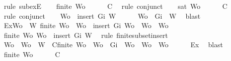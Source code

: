 \begin{isabellebody}
\ {\isacharparenleft}rule\ subexE{\isacharparenright}\isanewline
\ \ \isamarkupfalse%
\ {\isachardoublequoteopen}finite\ Wo{\isachardoublequoteclose}\isanewline
\ \ \ \ \isamarkupfalse%
\ C{}\ \isamarkupfalse%
\ {\isacharparenleft}rule\ conjunct{}{\isacharparenright}\isanewline
\ \ \isamarkupfalse%
\ {\isachardoublequoteopen}{\isasymnot}{\isacharparenleft}sat\ Wo{\isacharparenright}{\isachardoublequoteclose}\isanewline
\ \ \ \ \isamarkupfalse%
\ C{}\ \isamarkupfalse%
\ {\isacharparenleft}rule\ conjunct{}{\isacharparenright}\isanewline
\ \ \isamarkupfalse%
\ {\isachardoublequoteopen}Wo\ {\isasymsubseteq}\ insert\ Gi\ W{\isachardoublequoteclose}\isanewline
\ \ \ \ \isamarkupfalse%
\ {\isacartoucheopen}Wo\ {\isasymsubseteq}\ {\isacharbraceleft}Gi{\isacharbraceright}\ {\isasymunion}\ W{\isacartoucheclose}\ \isamarkupfalse%
\ blast\isanewline
\ \ \isamarkupfalse%
\ Ex{}{\isacharcolon}{\isachardoublequoteopen}{\isasymexists}Wo{\isacharprime}\ {\isasymsubseteq}\ W{\isachardot}\ finite\ Wo{\isacharprime}\ {\isasymand}\ {\isacharparenleft}Wo\ {\isacharequal}\ insert\ Gi\ Wo{\isacharprime}\ {\isasymor}\ Wo\ {\isacharequal}\ Wo{\isacharprime}{\isacharparenright}{\isachardoublequoteclose}\isanewline
\ \ \ \ \isamarkupfalse%
\ {\isacartoucheopen}finite\ Wo{\isacartoucheclose}\ {\isacartoucheopen}Wo\ {\isasymsubseteq}\ insert\ Gi\ W{\isacartoucheclose}\ \isamarkupfalse%
\ {\isacharparenleft}rule\ finite{\isacharunderscore}subset{\isacharunderscore}insert{}{\isacharparenright}\isanewline
\ \ \isamarkupfalse%
\ Wo{\isacharprime}\ \ {\isachardoublequoteopen}Wo{\isacharprime}\ {\isasymsubseteq}\ W{\isachardoublequoteclose}\ \ C{}{\isacharcolon}{\isachardoublequoteopen}finite\ Wo{\isacharprime}\ {\isasymand}\ {\isacharparenleft}Wo\ {\isacharequal}\ {\isacharbraceleft}Gi{\isacharbraceright}\ {\isasymunion}\ Wo{\isacharprime}\ {\isasymor}\ Wo\ {\isacharequal}\ Wo{\isacharprime}{\isacharparenright}{\isachardoublequoteclose}\isanewline
\ \ \ \ \isamarkupfalse%
\ Ex{}\ \isamarkupfalse%
\ blast\isanewline
\ \ \isamarkupfalse%
\ {\isachardoublequoteopen}finite\ Wo{\isacharprime}{\isachardoublequoteclose}\isanewline
\ \ \ \ \isamarkupfalse%
\ C{}\ \isamarkupfalse%

\end{isabellebody}
